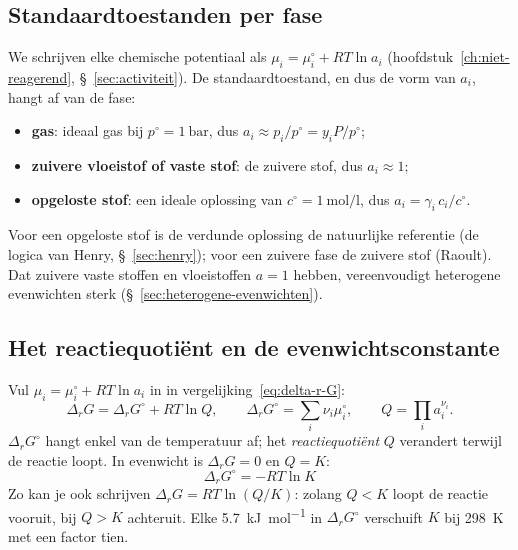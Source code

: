 \subsection{Standaardtoestanden per fase}
\label{sec:standaardtoestanden-reagerend}

We schrijven elke chemische potentiaal als $\mu_i = \mu_i^\circ + RT \ln a_i$ (hoofdstuk~\ref{ch:niet-reagerend}, \S~\ref{sec:activiteit}). De standaardtoestand, en dus de vorm van $a_i$, hangt af van de fase:
\begin{itemize}
\item \textbf{gas}: ideaal gas bij $p^\circ = \SI{1}{\bar}$, dus $a_i \approx p_i/p^\circ = y_i P/p^\circ$;
\item \textbf{zuivere vloeistof of vaste stof}: de zuivere stof, dus $a_i \approx 1$;
\item \textbf{opgeloste stof}: een ideale oplossing van $c^\circ = \SI{1}{\mole\per\litre}$, dus $a_i = \gamma_i\,c_i/c^\circ$.
\end{itemize}
Voor een opgeloste stof is de verdunde oplossing de natuurlijke referentie (de logica van Henry, \S~\ref{sec:henry}); voor een zuivere fase de zuivere stof (Raoult). Dat zuivere vaste stoffen en vloeistoffen $a = 1$ hebben, vereenvoudigt heterogene evenwichten sterk (\S~\ref{sec:heterogene-evenwichten}).

\subsection{Het reactiequoti\"ent en de evenwichtsconstante}
\label{sec:evenwichtsconstante-reagerend}\label{sec:evenwichtsconstante}

Vul $\mu_i = \mu_i^\circ + RT \ln a_i$ in in vergelijking~\eqref{eq:delta-r-G}:
\begin{equation}
\Delta_r G = \Delta_r G^\circ + RT \ln Q,
\qquad
\Delta_r G^\circ = \sum_i \nu_i \mu_i^\circ,
\qquad
Q = \prod_i a_i^{\nu_i}.
\end{equation}
$\Delta_r G^\circ$ hangt enkel van de temperatuur af; het \emph{reactiequoti\"ent} $Q$ verandert terwijl de reactie loopt. In evenwicht is $\Delta_r G = 0$ en $Q = K$:
\begin{equation}
\boxed{\;\Delta_r G^\circ = -RT \ln K\;}
\label{eq:K-uit-drG}
\end{equation}
Zo kan je ook schrijven $\Delta_rG = RT\ln(Q/K)$: zolang $Q < K$ loopt de reactie vooruit, bij $Q > K$ achteruit. Elke \SI{5.7}{\kilo\joule\per\mole} in $\Delta_rG^\circ$ verschuift $K$ bij \SI{298}{\kelvin} met een factor tien.

